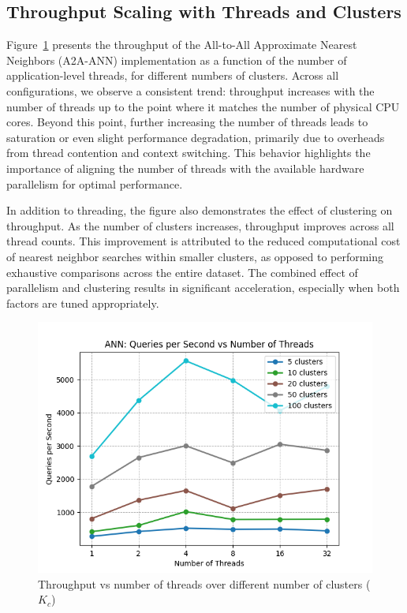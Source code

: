\documentclass[conference]{IEEEtran}
\begin{document}
\subsection{Throughput Scaling with Threads and Clusters}

Figure~\ref{fig:ann_throughput_vs_threads} presents the throughput of the All-to-All Approximate Nearest 
Neighbors (A2A-ANN) implementation as a function of the number of application-level threads, for different 
numbers of clusters. Across all configurations, we observe a consistent trend: throughput increases with the 
number of threads up to the point where it matches the number of physical CPU cores. Beyond this point, further
increasing the number of threads leads to saturation or even slight performance degradation, primarily due to 
overheads from thread contention and context switching. This behavior highlights the importance of aligning the
number of threads with the available hardware parallelism for optimal performance.

In addition to threading, the figure also demonstrates the effect of clustering on throughput. As the number of
clusters increases, throughput improves across all thread counts. This improvement is attributed to the reduced 
computational cost of nearest neighbor searches within smaller clusters, as opposed to performing exhaustive 
comparisons across the entire dataset. The combined effect of parallelism and clustering results in significant 
acceleration, especially when both factors are tuned appropriately.

\begin{figure}
    \centering
    \includegraphics[width=1\linewidth]{figures/ann_throughput_vs_threads.png}
    \caption{Throughput vs number of threads over different number of clusters ($K_c$)}
    \label{fig:ann_throughput_vs_threads}
\end{figure}
\end{document}
